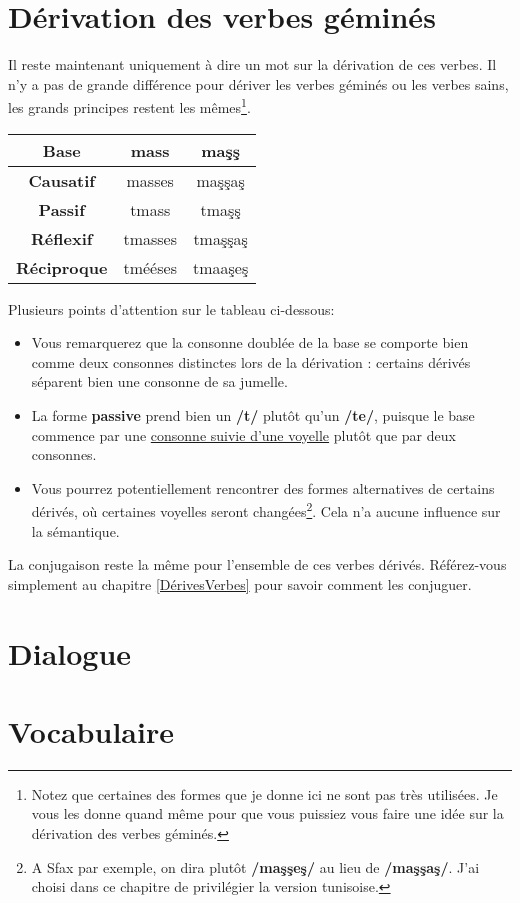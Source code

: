 \section{Dérivation des verbes géminés}
Il reste maintenant uniquement à dire un mot sur la dérivation de ces verbes. Il n'y a pas de grande différence pour dériver les verbes géminés ou les verbes sains, les grands principes restent les mêmes\footnote{Notez que certaines des formes que je donne ici ne sont pas très utilisées. Je vous les donne quand même pour que vous puissiez vous faire une idée sur la dérivation des verbes géminés.}. 

\begin{center}
    \begin{tabular}{||c | c | c||}
     \hline
     \textbf{Base} & \textbf{mass} & \textbf{ma\c{s}\c{s}} \\
     \hline\hline
     \textbf{Causatif} & masses & ma\c{s}\c{s}a\c{s} \\
    \hline
    \textbf{Passif} & tmass & tma\c{s}\c{s} \\
   \hline
   \textbf{Réflexif} & tmasses & tma\c{s}\c{s}a\c{s} \\
  \hline
  \textbf{Réciproque} & tmééses & tmaa\c{s}e\c{s} \\
 \hline
    \end{tabular}
\end{center}

Plusieurs points d'attention sur le tableau ci-dessous: 
\begin{itemize}
    \item Vous remarquerez que la consonne doublée de la base se comporte bien comme deux consonnes distinctes lors de la dérivation : certains dérivés séparent bien une consonne de sa jumelle.
    \item La forme \textbf{passive} prend bien un \textbf{/t/} plutôt qu'un \textbf{/te/}, puisque le base commence par une \underline{consonne suivie d'une voyelle} plutôt que par deux consonnes.
    \item Vous pourrez potentiellement rencontrer des formes alternatives de certains dérivés, où certaines voyelles seront changées\footnote{A Sfax par exemple, on dira plutôt \textbf{/ma\c{s}\c{s}e\c{s}/} au lieu de \textbf{/ma\c{s}\c{s}a\c{s}/}. J'ai choisi dans ce chapitre de privilégier la version tunisoise.}. Cela n'a aucune influence sur la sémantique.
\end{itemize}

La conjugaison reste la même pour l'ensemble de ces verbes dérivés. Référez-vous simplement au chapitre \ref{DérivesVerbes} pour savoir comment les conjuguer.


\section*{Dialogue}
\section*{Vocabulaire}